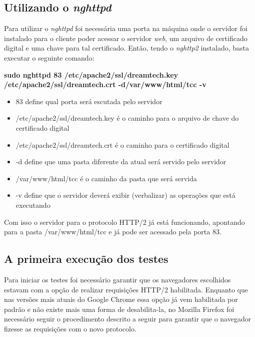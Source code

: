 \subsection{Utilizando o \textit{nghttpd}}
\label{utilizandoonghttpd}

Para utilizar o \textit{nghttpd} foi necessária uma porta na máquina onde o servidor foi instalado para o cliente poder acessar o servidor \textit{web}, um arquivo de certificado digital e uma chave para tal certificado. Então, tendo o \textit{nghttp2} instalado, basta executar o seguinte comando:

\textbf{sudo nghttpd 83 /etc/apache2/ssl/dreamtech.key /etc/apache2/ssl/dreamtech.crt -d/var/www/html/tcc -v}

\begin{itemize}
	\item 83 define qual porta será escutada pelo servidor
	\item /etc/apache2/ssl/dreamtech.key é o caminho para o arquivo de chave do certificado digital
	\item /etc/apache2/ssl/dreamtech.crt é o caminho para o certificado digital
	\item -d define que uma pasta diferente da atual será servido pelo servidor
	\item /var/www/html/tcc é o caminho da pasta que será servida
	\item -v define que o servidor deverá exibir (verbalizar) as operações que está executando
\end{itemize}

Com isso o servidor para o protocolo HTTP/2 já está funcionando, apontando para a pasta /var/www/html/tcc e já pode ser acessado pela porta 83.

\subsection{A primeira execução dos testes}
\label{aprimeiraexecucaodostestes}

Para iniciar os testes foi necessário garantir que os navegadores escolhidos estavam com a opção de realizar requisições HTTP/2 habilitada. Enquanto que nas versões mais atuais do Google Chrome essa opção já vem habilitada por padrão e não existe mais uma forma de desabilita-la, no Mozilla Firefox foi necessário seguir o procedimento descrito a seguir para garantir que o navegador fizesse as requisições com o novo protocolo.

